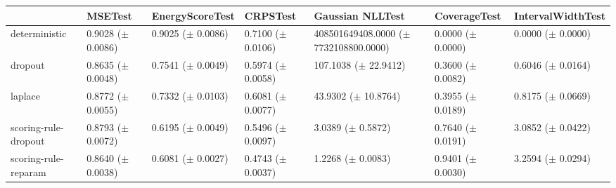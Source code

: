 \begin{tabular}{lllllll}
\toprule
 & MSETest & EnergyScoreTest & CRPSTest & Gaussian NLLTest & CoverageTest & IntervalWidthTest \\
\midrule
deterministic & \makecell{0.9028 \\ ($\pm$ 0.0086)} & \makecell{0.9025 \\ ($\pm$ 0.0086)} & \makecell{0.7100 \\ ($\pm$ 0.0106)} & \makecell{408501649408.0000 \\ ($\pm$ 7732108800.0000)} & \makecell{0.0000 \\ ($\pm$ 0.0000)} & \makecell{0.0000 \\ ($\pm$ 0.0000)} \\
dropout & \makecell{0.8635 \\ ($\pm$ 0.0048)} & \makecell{0.7541 \\ ($\pm$ 0.0049)} & \makecell{0.5974 \\ ($\pm$ 0.0058)} & \makecell{107.1038 \\ ($\pm$ 22.9412)} & \makecell{0.3600 \\ ($\pm$ 0.0082)} & \makecell{0.6046 \\ ($\pm$ 0.0164)} \\
laplace & \makecell{0.8772 \\ ($\pm$ 0.0055)} & \makecell{0.7332 \\ ($\pm$ 0.0103)} & \makecell{0.6081 \\ ($\pm$ 0.0077)} & \makecell{43.9302 \\ ($\pm$ 10.8764)} & \makecell{0.3955 \\ ($\pm$ 0.0189)} & \makecell{0.8175 \\ ($\pm$ 0.0669)} \\
scoring-rule-dropout & \makecell{0.8793 \\ ($\pm$ 0.0072)} & \makecell{0.6195 \\ ($\pm$ 0.0049)} & \makecell{0.5496 \\ ($\pm$ 0.0097)} & \makecell{3.0389 \\ ($\pm$ 0.5872)} & \makecell{0.7640 \\ ($\pm$ 0.0191)} & \makecell{3.0852 \\ ($\pm$ 0.0422)} \\
scoring-rule-reparam & \makecell{0.8640 \\ ($\pm$ 0.0038)} & \makecell{0.6081 \\ ($\pm$ 0.0027)} & \makecell{0.4743 \\ ($\pm$ 0.0037)} & \makecell{1.2268 \\ ($\pm$ 0.0083)} & \makecell{0.9401 \\ ($\pm$ 0.0030)} & \makecell{3.2594 \\ ($\pm$ 0.0294)} \\
\bottomrule
\end{tabular}
